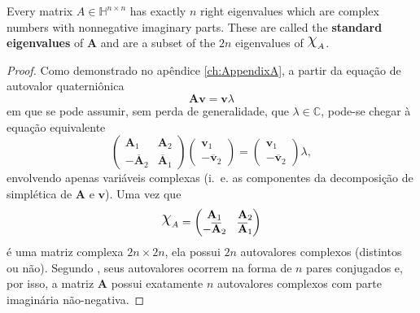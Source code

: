 \begin{theorem}
\label{th:02}
Every matrix $ A \in \mathbb{H}^{n \times n} $ has exactly $ n $ right eigenvalues which are complex numbers with nonnegative imaginary parts. These are called the \textbf{standard eigenvalues} of $ \mathbf{A} $ and are a subset of the $ 2n $ eigenvalues of $ \rchi_A $.
\end{theorem}

\begin{proof}
Como demonstrado no ap\^endice \ref{ch:AppendixA}, a partir da equa\c c\~ao de autovalor quaterni\^onica
\begin{equation}
\mathbf{A} \mathbf{v} = \mathbf{v} \lambda
\end{equation}
em que se pode assumir, sem perda de generalidade, que $ \lambda \in \mathbb{C} $, pode-se chegar \`a equa\c c\~ao equivalente
\begin{equation}
\label{eq:eigvalueequation}
\begin{pmatrix}
\mathbf{A}_1 & \mathbf{A}_2\\ 
- \overline{\mathbf{A}}_2 & \overline{\mathbf{A}}_1
\end{pmatrix}
\begin{pmatrix}
\mathbf{v}_1 \\ 
- \overline{\mathbf{v}}_2
\end{pmatrix} =
\begin{pmatrix}
\mathbf{v}_1 \\ 
- \overline{\mathbf{v}}_2
\end{pmatrix}
\lambda,
\end{equation}
envolvendo apenas vari\'aveis complexas (i.~e. as componentes da decomposi\c c\~ao de simpl\'etica de $ \mathbf{A} $ e $ \mathbf{v} $). Uma vez que
\begin{equation}
\rchi_A = 
\begin{pmatrix}
\mathbf{A}_1 & \mathbf{A}_2\\ 
- \overline{\mathbf{A}}_2 & \overline{\mathbf{A}}_1
\end{pmatrix}
\end{equation}
\'e uma matriz complexa $ 2n \times 2n $, ela possui $ 2n $ autovalores complexos (distintos ou não). Segundo \cite[Teorema 5]{lee1948eigenvalues}, seus autovalores ocorrem na forma de $ n $ pares conjugados e, por isso, a matriz $ \mathbf{A} $ possui exatamente $ n $ autovalores complexos com parte imagin\'aria n\~ao-negativa.


\end{proof}
